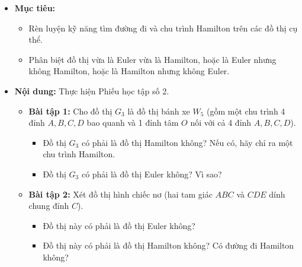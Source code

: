 \documentclass[12pt, a4paper]{article}
\begin{document}
\begin{itemize}[leftmargin=1.2cm]
    \item[a)] \textbf{Mục tiêu:}
    \begin{itemize}[leftmargin=0.6cm]
        \item Rèn luyện kỹ năng tìm đường đi và chu trình Hamilton trên các đồ thị cụ thể.
        \item Phân biệt đồ thị vừa là Euler vừa là Hamilton, hoặc là Euler nhưng không Hamilton, hoặc là Hamilton nhưng không Euler.
    \end{itemize}

    \item[b)] \textbf{Nội dung:} Thực hiện Phiếu học tập số 2.
    \begin{itemize}[leftmargin=0.6cm]
        \item \textbf{Bài tập 1:} Cho đồ thị $G_3$ là đồ thị bánh xe $W_5$ (gồm một chu trình 4 đỉnh $A, B, C, D$ bao quanh và 1 đỉnh tâm $O$ nối với cả 4 đỉnh $A, B, C, D$).
        \begin{itemize}
            \item Đồ thị $G_3$ có phải là đồ thị Hamilton không? Nếu có, hãy chỉ ra một chu trình Hamilton.
            \item Đồ thị $G_3$ có phải là đồ thị Euler không? Vì sao?
        \end{itemize}
        \item \textbf{Bài tập 2:} Xét đồ thị hình chiếc nơ (hai tam giác $ABC$ và $CDE$ dính chung đỉnh $C$).
        \begin{itemize}
            \item Đồ thị này có phải là đồ thị Euler không?
            \item Đồ thị này có phải là đồ thị Hamilton không? Có đường đi Hamilton không?
        \end{itemize}
    \end{itemize}


\end{itemize}
\end{document}

